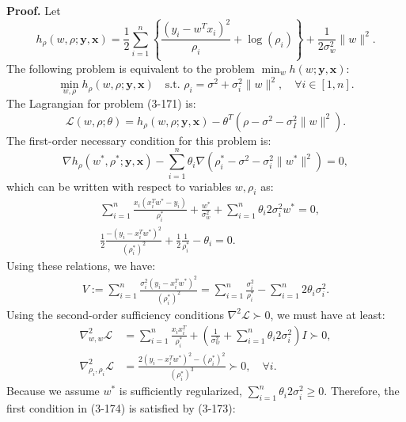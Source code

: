 	\textbf{Proof.} Let
	\begin{equation}
		h_\rho(w, \rho; \mathbf{y}, \mathbf{x}) = \frac{1}{2} \sum_{i=1}^{n} \left\{ \frac{(y_i - w^T x_i)^2}{\rho_i} + \log(\rho_i) \right\} + \frac{1}{2\sigma_w^2} \|w\|^2.
	\end{equation}
	The following problem is equivalent to the problem $\min_w h(w; \mathbf{y}, \mathbf{x})$:
	\begin{equation}
		\min_{w, \rho} h_\rho(w, \rho; \mathbf{y}, \mathbf{x}) \quad \text{s.t. } \rho_i = \sigma^2 + \sigma_i^2 \|w\|^2, \quad \forall i \in [1, n].
	\end{equation}
	The Lagrangian for problem (3-171) is:
	\begin{equation}
		\mathcal{L}(w, \rho; \theta) = h_\rho(w, \rho; \mathbf{y}, \mathbf{x}) - \theta^T(\rho - \sigma^2 - \sigma_I^2 \|w\|^2).
	\end{equation}
	The first-order necessary condition for this problem is:
	\begin{equation}
		\nabla h_\rho(w^*, \rho^*; \mathbf{y}, \mathbf{x}) - \sum_{i=1}^{n} \theta_i \nabla (\rho_i^* - \sigma^2 - \sigma_i^2 \|w^*\|^2) = 0,
	\end{equation}
	which can be written with respect to variables $w, \rho_i$ as:
	\begin{align}
		&\sum_{i=1}^{n} \frac{x_i (x_i^T w^* - y_i)}{\rho_i^*} + \frac{w^*}{\sigma_w^2} + \sum_{i=1}^{n} \theta_i 2 \sigma_i^2 w^* = 0, \\
		&\frac{1}{2} \frac{-(y_i - x_i^T w^*)^2}{(\rho_i^*)^2} + \frac{1}{2} \frac{1}{\rho_i^*} - \theta_i = 0.
	\end{align}
	Using these relations, we have:
	\begin{align}
		V := \sum_{i=1}^{n} \frac{\sigma_i^2 (y_i - x_i^T w^*)^2}{(\rho_i^*)^2} = \sum_{i=1}^{n} \frac{\sigma_i^2}{\rho_i^*} - \sum_{i=1}^{n} 2 \theta_i \sigma_i^2.
	\end{align}
	Using the second-order sufficiency conditions $\nabla^2 \mathcal{L} \succ 0$, we must have at least:
	\begin{align}
		\nabla^2_{w,w} \mathcal{L} &= \sum_{i=1}^{n} \frac{x_i x_i^T}{\rho_i^*} + \left( \frac{1}{\sigma_w^2} + \sum_{i=1}^{n} \theta_i 2 \sigma_i^2 \right) I \succ 0, \\
		\nabla^2_{\rho_i, \rho_i} \mathcal{L} &= \frac{2(y_i - x_i^T w^*)^2 - (\rho_i^*)^2}{(\rho_i^*)^3} \succ 0, \quad \forall i.
	\end{align}
	Because we assume $w^*$ is sufficiently regularized, $\sum_{i=1}^{n} \theta_i 2 \sigma_i^2 \ge 0$. Therefore, the first condition in (3-174) is satisfied by (3-173):
